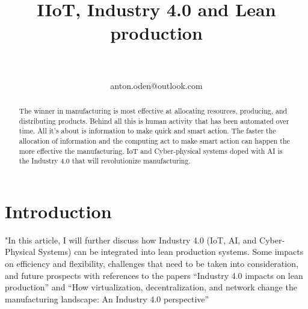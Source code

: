\documentclass[article,a4paper]{IEEEtran}
\title{IIoT, Industry 4.0 and Lean production}
\author{
\IEEEauthorblockN{Anton Odén}\\
\IEEEauthorblockA{Dept. of Maths and Computer Science\\Karlstad University\\
651 88 KARLSTAD, Sweden}\\
anton.oden@outlook.com
}
\begin{document}
\maketitle
    \begin{abstract}
        The winner in manufacturing is most effective at allocating resources, producing, and distributing products. Behind all this is human activity that has been automated over time. All it’s about is information to make quick and smart action. The faster the allocation of information and the computing act to make smart action can happen the more effective the manufacturing. IoT and Cyber-physical systems doped with AI is the Industry 4.0 that will revolutionize manufacturing. 
    \end{abstract}
    
    \section{Introduction}
    "In this article, I will further discuss how Industry 4.0 (IoT, AI, and Cyber-Physical Systems) can be integrated into lean production systems. Some impacts on efficiency and flexibility, challenges that need to be taken into consideration, and future prospects with references to the papers “Industry 4.0 impacts on lean production” \cite{Impact_Lean_Prod} and “How virtualization, decentralization, and network change the manufacturing landscape: An Industry 4.0 perspective” \cite{Change_Man_Landscape}
\end{document}
